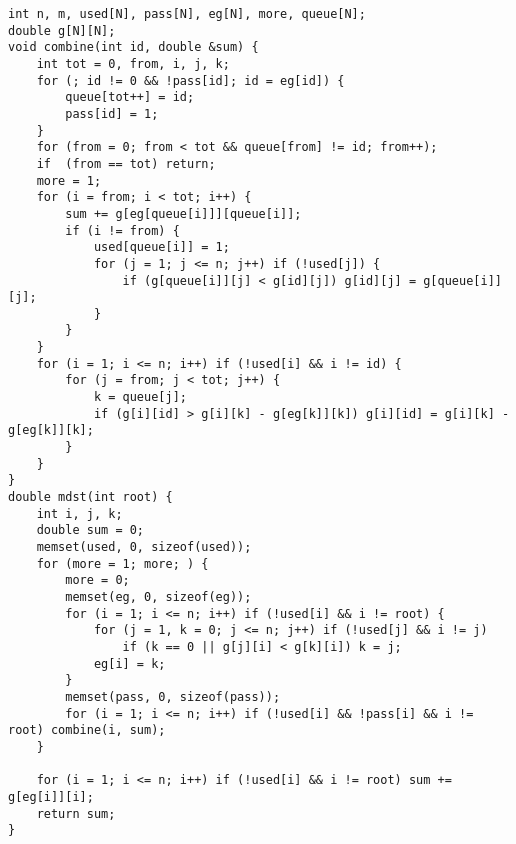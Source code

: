 \begin{lstlisting}
int n, m, used[N], pass[N], eg[N], more, queue[N];
double g[N][N];
void combine(int id, double &sum) {
	int tot = 0, from, i, j, k;
	for (; id != 0 && !pass[id]; id = eg[id]) {
		queue[tot++] = id;
		pass[id] = 1;
	}
	for (from = 0; from < tot && queue[from] != id; from++);
	if  (from == tot) return;
	more = 1;
	for (i = from; i < tot; i++) {
		sum += g[eg[queue[i]]][queue[i]];
		if (i != from) {
			used[queue[i]] = 1;
			for (j = 1; j <= n; j++) if (!used[j]) {
				if (g[queue[i]][j] < g[id][j]) g[id][j] = g[queue[i]][j];
			}
		}
	}
	for (i = 1; i <= n; i++) if (!used[i] && i != id) {
		for (j = from; j < tot; j++) {
			k = queue[j];
			if (g[i][id] > g[i][k] - g[eg[k]][k]) g[i][id] = g[i][k] - g[eg[k]][k];
		}
	}
}
double mdst(int root) {
	int i, j, k;
	double sum = 0;
	memset(used, 0, sizeof(used));
	for (more = 1; more; ) {
		more = 0;
		memset(eg, 0, sizeof(eg));
		for (i = 1; i <= n; i++) if (!used[i] && i != root) {
			for (j = 1, k = 0; j <= n; j++) if (!used[j] && i != j)
				if (k == 0 || g[j][i] < g[k][i]) k = j;
			eg[i] = k;
		}
		memset(pass, 0, sizeof(pass));
		for (i = 1; i <= n; i++) if (!used[i] && !pass[i] && i != root) combine(i, sum);
	}

	for (i = 1; i <= n; i++) if (!used[i] && i != root) sum += g[eg[i]][i];
	return sum;
}
\end{lstlisting}

